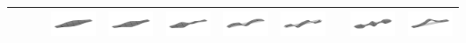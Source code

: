 \documentclass{article}
\begin{document}
\begin{tabular}{l|c|c|c|c|c|c|c|c|c|c}
 &  &  & \includegraphics[width=0.090909\linewidth]{figures/modes_ussy_0305_mode03.png} & \includegraphics[width=0.090909\linewidth]{figures/modes_ussy_0305_mode04.png} & \includegraphics[width=0.090909\linewidth]{figures/modes_ussy_0305_mode05.png} & \includegraphics[width=0.090909\linewidth]{figures/modes_ussy_0305_mode06.png} & \includegraphics[width=0.090909\linewidth]{figures/modes_ussy_0305_mode07.png} &  & \includegraphics[width=0.090909\linewidth]{figures/modes_ussy_0305_mode09.png} & \includegraphics[width=0.090909\linewidth]{figures/modes_ussy_0305_mode10.png} \\ \hline
\end{tabular}

\vspace*{\fill}
\end{document}
